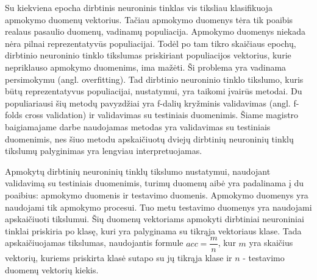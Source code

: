 Su kiekviena epocha dirbtinis neuroninis tinklas vis tiksliau klasifikuoja apmokymo duomenų vektorius. Tačiau apmokymo duomenys tėra tik poaibis realaus pasaulio duomenų, vadinamų populiacija. Apmokymo duomenys niekada nėra pilnai reprezentatyvūs populiacijai. Todėl po tam tikro skaičiaus epochų, dirbtinio neuroninio tinklo tikslumas priskiriant populiacijos vektorius, kurie nepriklauso apmokymo duomenims, ima mažėti. Ši problema yra vadinama persimokymu (angl. overfitting). Tad dirbtinio neuroninio tinklo tikslumo, kuris būtų reprezentatyvus populiacijai, nustatymui, yra taikomi įvairūs metodai. Du populiariausi šių metodų pavyzdžiai yra f-dalių kryžminis validavimas (angl. f-folds cross validation) ir validavimas su testiniais duomenimis. Šiame magistro baigiamajame darbe naudojamas metodas yra validavimas su testiniais duomenimis, nes šiuo metodu apskaičiuotų dviejų dirbtinių neuroninių tinklų tikslumų palyginimas yra lengviau interpretuojamas.

Apmokytų dirbtinių neuroninių tinklų tikslumo nustatymui, naudojant validavimą su testiniais duomenimis, turimų duomenų aibė yra padalinama į du poaibius: apmokymo duomenis ir testavimo duomenis.  Apmokymo duomenys yra naudojami tik apmokymo procesui. Tuo metu testavimo duomenys yra naudojami apskaičiuoti tikslumui. Šių duomenų vektoriams apmokyti dirbtiniai neuroniniai tinklai priskiria po klasę, kuri yra palyginama su tikrąja vektoriaus klase. Tada apskaičiuojamas tikslumas, naudojantis formule $acc = \dfrac{m}{n}$, kur $m$ yra skaičius vektorių, kuriems priskirta klasė sutapo su jų tikrąja klase ir $n$ - testavimo duomenų vektorių kiekis.
